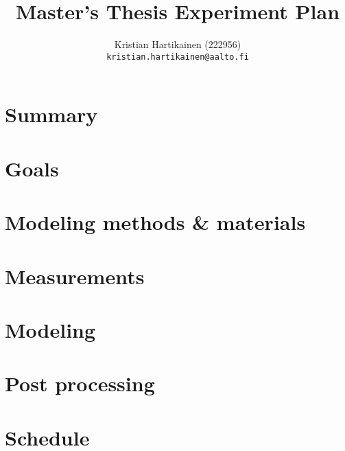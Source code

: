 \documentclass[a4paper,10pt]{article}
\title{Master's Thesis Experiment Plan}
\author{Kristian Hartikainen (222956)\\
       {\tt kristian.hartikainen@aalto.fi}}
\begin{document}
\maketitle

\section{Summary}


\section{Goals}


\section{Modeling methods \& materials}


\section{Measurements}


\section{Modeling}


\section{Post processing}


\section{Schedule}

\end{document}
